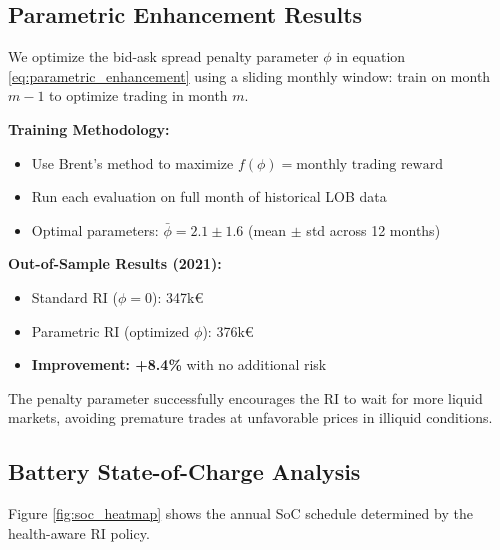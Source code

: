 \documentclass[10pt,twocolumn]{article}
\begin{document}
\subsection{Parametric Enhancement Results}
We optimize the bid-ask spread penalty parameter $\phi$ in equation \eqref{eq:parametric_enhancement} using a sliding monthly window: train on month $m-1$ to optimize trading in month $m$.

\textbf{Training Methodology:}
\begin{itemize}
\item Use Brent's method to maximize $f(\phi) = \text{monthly trading reward}$
\item Run each evaluation on full month of historical LOB data
\item Optimal parameters: $\bar{\phi} = 2.1 \pm 1.6$ (mean $\pm$ std across 12 months)
\end{itemize}

\textbf{Out-of-Sample Results (2021):}
\begin{itemize}
\item Standard RI ($\phi = 0$): 347k€
\item Parametric RI (optimized $\phi$): 376k€
\item \textbf{Improvement: +8.4\%} with no additional risk
\end{itemize}

The penalty parameter successfully encourages the RI to wait for more liquid markets, avoiding premature trades at unfavorable prices in illiquid conditions.

\subsection{Battery State-of-Charge Analysis}
Figure \ref{fig:soc_heatmap} shows the annual SoC schedule determined by the health-aware RI policy.

\end{document}
